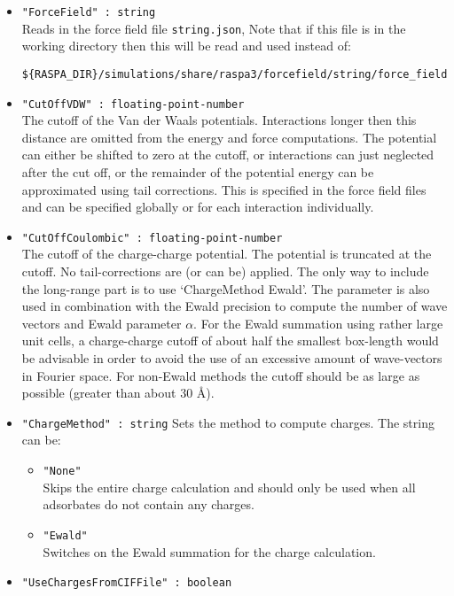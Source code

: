 \begin{itemize}
\item{\verb+"ForceField" : string+}\\
Reads in the force field file \verb+string.json+,
Note that if this file is in the working directory then this will be read and used instead of:
\begin{verbatim}
${RASPA_DIR}/simulations/share/raspa3/forcefield/string/force_field.json
\end{verbatim}
\item{\verb+"CutOffVDW" : floating-point-number+}\\
The cutoff of the Van der Waals potentials. Interactions longer then this distance are omitted from the
energy and force computations. The potential can either be shifted to zero at the cutoff, or interactions
can just neglected after the cut off, or the remainder of the potential energy can be approximated using
tail corrections. This is specified in the force field files and can be specified globally or
for each interaction individually.
\item{\verb+"CutOffCoulombic" : floating-point-number+}\\
The cutoff of the charge-charge potential. The potential is truncated at the cutoff.
No tail-corrections are (or can be) applied. The only way to include the long-range part is to use `ChargeMethod Ewald'.
The parameter is also used in combination with the
Ewald precision to compute the number of wave vectors and Ewald parameter $\alpha$.
For the Ewald summation using rather large unit cells, a charge-charge cutoff of about half the smallest box-length would be advisable
in order to avoid the use of an excessive amount of wave-vectors in Fourier space. For non-Ewald methods the cutoff should be as large
as possible (greater than about 30 \AA).
\item{\verb+"ChargeMethod" : string+}
Sets the method to compute charges. The string can be:
  \begin{itemize}
  \item{\verb+"None"+}\\
    Skips the entire charge calculation and should only be used when all adsorbates do not contain any charges.
  \item{\verb+"Ewald"+}\\
    Switches on the Ewald summation for the charge calculation.
  \end{itemize}
\item{\verb+"UseChargesFromCIFFile" : boolean+}
\end{itemize}

